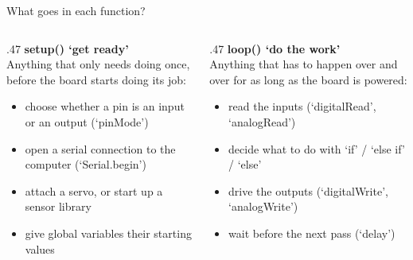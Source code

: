 \documentclass[aspectratio=169]{beamer}
\begin{document}
\begin{frame}{What goes in each function?}
    \normalsize
    \begin{columns}[t]
        \begin{column}{.47\textwidth}
            \textbf{setup() \textrightarrow{} `get ready'}\\
            Anything that only needs doing once, before the board starts doing its job:
            \vspace{.5em}
            \begin{itemize}
                \item choose whether a pin is an input or an output (`pinMode')
                \vspace{.25em}
                \item open a serial connection to the computer (`Serial.begin')
                \vspace{.25em}
                \item attach a servo, or start up a sensor library
                \vspace{.25em}
                \item give global variables their starting values
            \end{itemize}
        \end{column}
        \begin{column}{.47\textwidth}
            \textbf{loop() \textrightarrow{} `do the work'}\\
            Anything that has to happen over and over for as long as the board is powered:
            \vspace{.5em}
            \begin{itemize}
                \item read the inputs (`digitalRead', `analogRead')
                \vspace{.25em}
                \item decide what to do with `if' / `else if' / `else'
                \vspace{.25em}
                \item drive the outputs (`digitalWrite', `analogWrite')
                \vspace{.25em}
                \item wait before the next pass (`delay')
            \end{itemize}
        \end{column}
    \end{columns}
\end{frame}
\end{document}
